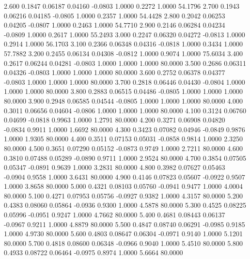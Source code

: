   2.600   0.1847   0.06187   0.04160  -0.0803   1.0000   0.2272   1.0000  54.1796
   2.700   0.1943   0.06216   0.04185  -0.0805   1.0000   0.2357   1.0000  54.4428
   2.800   0.2042   0.06253   0.04205  -0.0807   1.0000   0.2463   1.0000  54.7710
   2.900   0.2146   0.06284   0.04234  -0.0809   1.0000   0.2617   1.0000  55.2493
   3.000   0.2247   0.06320   0.04272  -0.0813   1.0000   0.2914   1.0000  56.1703
   3.100   0.2366   0.06348   0.04316  -0.0818   1.0000   0.3434   1.0000  57.7882
   3.200   0.2455   0.06134   0.04308  -0.0812   1.0000   0.9074   1.0000  75.6034
   3.400   0.2617   0.06244   0.04281  -0.0803   1.0000   1.0000   1.0000  80.0000
   3.500   0.2686   0.06311   0.04326  -0.0803   1.0000   1.0000   1.0000  80.0000
   3.600   0.2752   0.06378   0.04377  -0.0803   1.0000   1.0000   1.0000  80.0000
   3.700   0.2818   0.06446   0.04430  -0.0804   1.0000   1.0000   1.0000  80.0000
   3.800   0.2883   0.06515   0.04486  -0.0805   1.0000   1.0000   1.0000  80.0000
   3.900   0.2948   0.06585   0.04544  -0.0805   1.0000   1.0000   1.0000  80.0000
   4.000   0.3011   0.06656   0.04604  -0.0806   1.0000   1.0000   1.0000  80.0000
   4.100   0.3124   0.06760   0.04699  -0.0818   0.9963   1.0000   1.2791  80.0000
   4.200   0.3271   0.06908   0.04820  -0.0834   0.9911   1.0000   1.6692  80.0000
   4.300   0.3423   0.07082   0.04946  -0.0849   0.9876   1.0000   1.9305  80.0000
   4.400   0.3511   0.07153   0.05031  -0.0858   0.9814   1.0000   2.3250  80.0000
   4.500   0.3651   0.07290   0.05152  -0.0873   0.9749   1.0000   2.7211  80.0000
   4.600   0.3810   0.07488   0.05289  -0.0890   0.9711   1.0000   2.9524  80.0000
   4.700   0.3854   0.07505   0.05347  -0.0891   0.9639   1.0000   3.2831  80.0000
   4.800   0.3982   0.07627   0.05463  -0.0904   0.9558   1.0000   3.6431  80.0000
   4.900   0.4146   0.07823   0.05607  -0.0922   0.9507   1.0000   3.8658  80.0000
   5.000   0.4321   0.08103   0.05760  -0.0941   0.9477   1.0000   4.0004  80.0000
   5.100   0.4271   0.07953   0.05756  -0.0927   0.9382   1.0000   4.3157  80.0000
   5.200   0.4383   0.08060   0.05864  -0.0936   0.9300   1.0000   4.5878  80.0000
   5.300   0.4525   0.08225   0.05996  -0.0951   0.9247   1.0000   4.7662  80.0000
   5.400   0.4681   0.08443   0.06137  -0.0967   0.9211   1.0000   4.8879  80.0000
   5.500   0.4847   0.08740   0.06291  -0.0985   0.9185   1.0000   4.9730  80.0000
   5.600   0.4803   0.08647   0.06304  -0.0971   0.9140   1.0000   5.1201  80.0000
   5.700   0.4818   0.08600   0.06348  -0.0966   0.9040   1.0000   5.4510  80.0000
   5.800   0.4933   0.08722   0.06464  -0.0975   0.8974   1.0000   5.6664  80.0000
